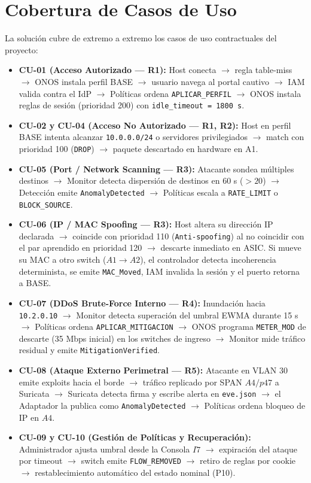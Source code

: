 \documentclass[11pt,a4paper]{report}
\begin{document}
\section{Cobertura de Casos de Uso}
La solución cubre de extremo a extremo los casos de uso contractuales del proyecto:
\begin{itemize}[leftmargin=*]
    \item \textbf{CU-01 (Acceso Autorizado --- R1):} Host conecta $\rightarrow$ regla table-miss $\rightarrow$ ONOS instala perfil BASE $\rightarrow$ usuario navega al portal cautivo $\rightarrow$ IAM valida contra el IdP $\rightarrow$ Políticas ordena \texttt{APLICAR\_PERFIL} $\rightarrow$ ONOS instala reglas de sesión (prioridad 200) con \texttt{idle\_timeout = 1800 s}.
    \item \textbf{CU-02 y CU-04 (Acceso No Autorizado --- R1, R2):} Host en perfil BASE intenta alcanzar \texttt{10.0.0.0/24} o servidores privilegiados $\rightarrow$ match con prioridad 100 (\texttt{DROP}) $\rightarrow$ paquete descartado en hardware en A1.
    \item \textbf{CU-05 (Port / Network Scanning --- R3):} Atacante sondea múltiples destinos $\rightarrow$ Monitor detecta dispersión de destinos en 60 s ($>20$) $\rightarrow$ Detección emite \texttt{AnomalyDetected} $\rightarrow$ Políticas escala a \texttt{RATE\_LIMIT} o \texttt{BLOCK\_SOURCE}.
    \item \textbf{CU-06 (IP / MAC Spoofing --- R3):} Host altera su dirección IP declarada $\rightarrow$ coincide con prioridad 110 (\texttt{Anti-spoofing}) al no coincidir con el par aprendido en prioridad 120 $\rightarrow$ descarte inmediato en ASIC. Si mueve su MAC a otro switch ($A1 \rightarrow A2$), el controlador detecta incoherencia determinista, se emite \texttt{MAC\_Moved}, IAM invalida la sesión y el puerto retorna a BASE.
    \item \textbf{CU-07 (DDoS Brute-Force Interno --- R4):} Inundación hacia \texttt{10.2.0.10} $\rightarrow$ Monitor detecta superación del umbral EWMA durante 15 s $\rightarrow$ Políticas ordena \texttt{APLICAR\_MITIGACION} $\rightarrow$ ONOS programa \texttt{METER\_MOD} de descarte (35 Mbps inicial) en los switches de ingreso $\rightarrow$ Monitor mide tráfico residual y emite \texttt{MitigationVerified}.
    \item \textbf{CU-08 (Ataque Externo Perimetral --- R5):} Atacante en VLAN 30 emite exploits hacia el borde $\rightarrow$ tráfico replicado por SPAN $A4/p47$ a Suricata $\rightarrow$ Suricata detecta firma y escribe alerta en \texttt{eve.json} $\rightarrow$ el Adaptador la publica como \texttt{AnomalyDetected} $\rightarrow$ Políticas ordena bloqueo de IP en $A4$.
    \item \textbf{CU-09 y CU-10 (Gestión de Políticas y Recuperación):} Administrador ajusta umbral desde la Consola $I7$ $\rightarrow$ expiración del ataque por timeout $\rightarrow$ switch emite \texttt{FLOW\_REMOVED} $\rightarrow$ retiro de reglas por cookie $\rightarrow$ restablecimiento automático del estado nominal (P10).
\end{itemize}
\end{document}
